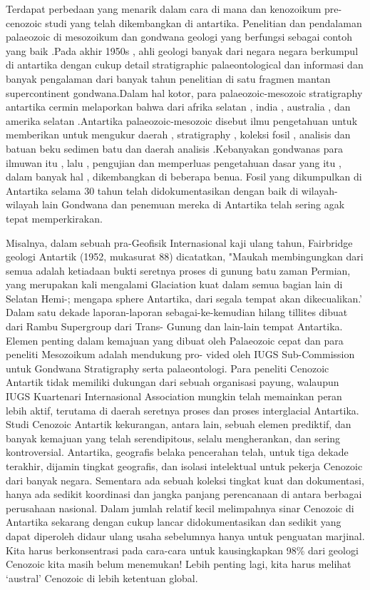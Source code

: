 		Terdapat perbedaan yang menarik dalam cara di mana dan kenozoikum pre-cenozoic studi yang telah dikembangkan di antartika.
	Penelitian dan pendalaman palaeozoic di mesozoikum dan gondwana  geologi yang berfungsi sebagai contoh yang baik .Pada akhir 1950s , 
	ahli geologi banyak dari negara negara berkumpul di antartika dengan cukup detail stratigraphic palaeontological dan informasi dan banyak pengalaman 
	dari banyak tahun penelitian di satu fragmen mantan supercontinent gondwana.Dalam hal kotor, para palaeozoic-mesozoic stratigraphy antartika 
	cermin melaporkan bahwa dari afrika selatan , india , australia , dan amerika selatan .Antartika palaeozoic-mesozoic disebut ilmu pengetahuan untuk 
	memberikan untuk mengukur daerah , stratigraphy , koleksi fosil , analisis dan batuan beku sedimen batu dan daerah analisis .Kebanyakan gondwanas  
	para ilmuwan itu , lalu , pengujian dan memperluas pengetahuan dasar yang itu , dalam banyak hal , dikembangkan di beberapa benua. 
	Fosil yang dikumpulkan di Antartika selama 30 tahun telah didokumentasikan dengan baik di wilayah-wilayah lain Gondwana dan penemuan mereka di Antartika 
	telah sering agak tepat memperkirakan. 
	
		Misalnya, dalam sebuah pra-Geofisik Internasional kaji ulang tahun, Fairbridge geologi Antartik (1952, mukasurat 88) dicatatkan, 
	"Maukah membingungkan dari semua adalah ketiadaan bukti seretnya proses di gunung batu zaman Permian, yang merupakan kali mengalami Glaciation 
	kuat dalam semua bagian lain di Selatan Hemi-; mengapa sphere Antartika, dari segala tempat akan dikecualikan.' Dalam satu dekade laporan-laporan 
	sebagai-ke-kemudian hilang tillites dibuat dari Rambu Supergroup dari Trans- Gunung dan lain-lain tempat Antartika. Elemen penting dalam kemajuan yang 
	dibuat oleh Palaeozoic cepat dan para peneliti Mesozoikum adalah mendukung pro- vided oleh IUGS Sub-Commission untuk Gondwana Stratigraphy serta 
	palaeontologi. Para peneliti Cenozoic Antartik tidak memiliki dukungan dari sebuah organisasi payung, walaupun IUGS Kuartenari Internasional Association 
	mungkin telah memainkan peran lebih aktif, terutama di daerah seretnya proses dan proses interglacial Antartika. Studi Cenozoic Antartik kekurangan, 
	antara lain, sebuah elemen prediktif, dan banyak kemajuan yang telah serendipitous, selalu mengherankan, dan sering kontroversial. 
	Antartika, geografis belaka pencerahan telah, untuk tiga dekade terakhir, dijamin tingkat geografis, dan isolasi intelektual untuk pekerja Cenozoic 
	dari banyak negara. Sementara ada sebuah koleksi tingkat kuat dan dokumentasi, hanya ada sedikit koordinasi dan jangka panjang perencanaan di antara 
	berbagai perusahaan nasional. Dalam jumlah relatif kecil melimpahnya sinar Cenozoic di Antartika sekarang dengan cukup lancar didokumentasikan dan 
	sedikit yang dapat diperoleh didaur ulang usaha sebelumnya hanya untuk penguatan marjinal. Kita harus berkonsentrasi pada cara-cara untuk kausingkapkan 
	98\% dari geologi Cenozoic kita masih belum menemukan! Lebih penting lagi, kita harus melihat `austral' Cenozoic di lebih ketentuan global\cite{peter1990Antartica}.
	

